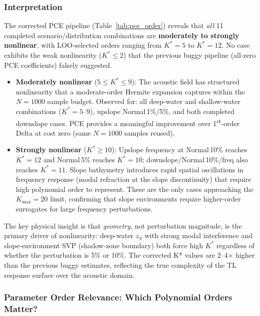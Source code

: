 \documentclass[11pt,a4paper]{article}
\begin{document}
\subsubsection{Interpretation}

The corrected PCE pipeline (Table~\ref{tab:pce_order}) reveals that \emph{all} 11 completed
scenario/distribution combinations are \textbf{moderately to strongly nonlinear}, with
LOO-selected orders ranging from $K^*=5$ to $K^*=12$.
No case exhibits the weak nonlinearity ($K^*\leq2$) that the previous buggy pipeline
(all-zero PCE coefficients) falsely suggested.

\begin{itemize}
  \item \textbf{Moderately nonlinear} ($5 \leq K^* \leq 9$): The acoustic field has
        structured nonlinearity that a moderate-order Hermite expansion captures within the
        $N=1000$ sample budget.
        Observed for: all deep-water and shallow-water combinations ($K^*=5$--$9$),
        upslope Normal\,1\%/5\%, and both completed downslope cases.
        PCE provides a meaningful improvement over 1\textsuperscript{st}-order Delta at
        cost zero (same $N=1000$ samples reused).
  \item \textbf{Strongly nonlinear} ($K^* \geq 10$): Upslope frequency at Normal\,10\%
        reaches $K^*=12$ and Normal\,5\% reaches $K^*=10$; downslope/Normal\,10\%/freq
        also reaches $K^*=11$.  Slope bathymetry introduces rapid spatial oscillations
        in frequency response (modal refraction at the slope discontinuity) that
        require high polynomial order to represent.
        These are the only cases approaching the $K_{\max}=20$ limit, confirming that
        slope environments require higher-order surrogates for large frequency perturbations.
\end{itemize}

The key physical insight is that \emph{geometry}, not perturbation magnitude, is the
primary driver of nonlinearity: deep-water $z_S$ with strong modal interference and
slope-environment SVP (shadow-zone boundary) both force high $K^*$ regardless of whether
the perturbation is 5\% or 10\%.
The corrected K* values are 2--4$\times$ higher than the previous buggy estimates,
reflecting the true complexity of the TL response surface over the acoustic domain.

\subsubsection{Parameter Order Relevance: Which Polynomial Orders Matter?}
\label{sec:pce_relevance}
\end{document}

